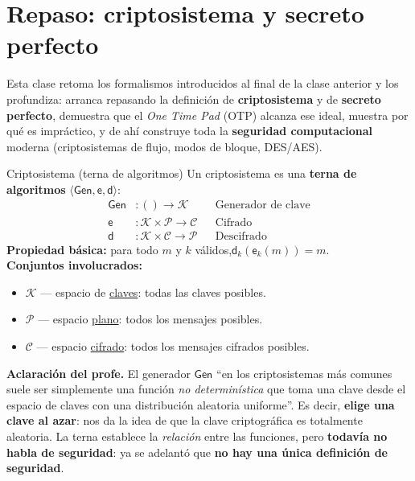\documentclass[11pt,a4paper]{article}
\newcommand{\Kset}{\mathcal{K}}
\newcommand{\Cset}{\mathcal{C}}
\newcommand{\Pset}{\mathcal{P}}
\newcommand{\Gen}{\mathsf{Gen}}
\newcommand{\E}{\mathsf{e}}
\newcommand{\D}{\mathsf{d}}
\begin{document}
\tableofcontents
\newpage

\section{Repaso: criptosistema y secreto perfecto}

Esta clase retoma los formalismos introducidos al final de la clase anterior y los
profundiza: arranca repasando la definición de \textbf{criptosistema} y de
\textbf{secreto perfecto}, demuestra que el \emph{One Time Pad} (OTP) alcanza ese ideal,
muestra por qué es impráctico, y de ahí construye toda la \textbf{seguridad
computacional} moderna (criptosistemas de flujo, modos de bloque, DES/AES).

\begin{defbox}{Criptosistema (terna de algoritmos)}
Un criptosistema es una \textbf{terna de algoritmos} $\langle \Gen,\E,\D\rangle$:
\[
\begin{aligned}
  \Gen &: ()\to \Kset && \text{Generador de clave}\\
  \E &: \Kset\times\Pset \to \Cset && \text{Cifrado}\\
  \D &: \Kset\times\Cset \to \Pset && \text{Descifrado}
\end{aligned}
\]
\textbf{Propiedad básica:} para todo $m$ y $k$ válidos,\quad $\D_k(\E_k(m))=m$.\\[4pt]
\textbf{Conjuntos involucrados:}
\begin{itemize}[leftmargin=1.4em,itemsep=1pt]
  \item $\Kset$ — espacio de \underline{claves}: todas las claves posibles.
  \item $\Pset$ — espacio \underline{plano}: todos los mensajes posibles.
  \item $\Cset$ — espacio \underline{cifrado}: todos los mensajes cifrados posibles.
\end{itemize}
\end{defbox}

\begin{slidebox}
\textbf{Aclaración del profe.} El generador $\Gen$ ``en los criptosistemas más comunes
suele ser simplemente una función \emph{no determinística} que toma una clave desde el
espacio de claves con una distribución aleatoria uniforme''. Es decir, \textbf{elige una
clave al azar}: nos da la idea de que la clave criptográfica es totalmente aleatoria. La
terna establece la \emph{relación} entre las funciones, pero \textbf{todavía no habla de
seguridad}: ya se adelantó que \textbf{no hay una única definición de seguridad}.
\end{slidebox}
\end{document}

